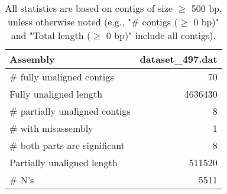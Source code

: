 \documentclass[12pt,a4paper]{article}
\begin{document}
\begin{table}[ht]
\begin{center}
\caption{All statistics are based on contigs of size $\geq$ 500 bp, unless otherwise noted (e.g., "\# contigs ($\geq$ 0 bp)" and "Total length ($\geq$ 0 bp)" include all contigs).}
\begin{tabular}{|l*{1}{|r}|}
\hline
Assembly & dataset\_497.dat \\ \hline
\# fully unaligned contigs & 70 \\ \hline
Fully unaligned length & 4636430 \\ \hline
\# partially unaligned contigs & 8 \\ \hline
\hspace{5mm}\# with misassembly & 1 \\ \hline
\hspace{5mm}\# both parts are significant & 8 \\ \hline
Partially unaligned length & 511520 \\ \hline
\# N's & 5511 \\ \hline
\end{tabular}
\end{center}
\end{table}
\end{document}
